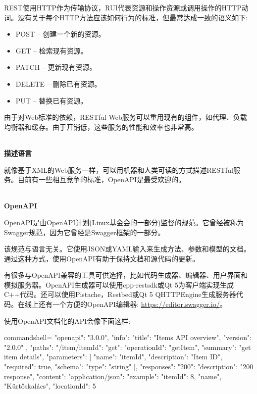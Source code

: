 REST使用HTTP作为传输协议，RUI代表资源和操作资源或调用操作的HTTP动词。没有关于每个HTTP方法应该如何行为的标准，但最常达成一致的语义如下:

\begin{itemize}
\item 
POST – 创建一个新的资源。

\item 
GET – 检索现有资源。

\item 
PATCH – 更新现有资源。

\item 
DELETE – 删除已有资源。

\item 
PUT – 替换已有资源。
\end{itemize}

由于对Web标准的依赖，RESTful Web服务可以重用现有的组件，如代理、负载均衡器和缓存。由于开销低，这些服务的性能和效率也非常高。

\hspace*{\fill} \\ %
\noindent
\textbf{描述语言}

就像基于XML的Web服务一样，可以用机器和人类可读的方式描述RESTful服务。目前有一些相互竞争的标准，OpenAPI是最受欢迎的。

\hspace*{\fill} \\ %
\noindent
\textbf{OpenAPI}

OpenAPI是由OpenAPI计划(Linux基金会的一部分)监督的规范。它曾经被称为Swagger规范，因为它曾经是Swagger框架的一部分。

该规范与语言无关。它使用JSON或YAML输入来生成方法、参数和模型的文档。通过这种方式，使用OpenAPI有助于保持文档和源代码的更新。

有很多与OpenAPI兼容的工具可供选择，比如代码生成器、编辑器、用户界面和模拟服务器。OpenAPI生成器可以使用cpp-restsdk或Qt 5为客户端实现生成C++代码。还可以使用Pistache，Restbed或Qt 5 QHTTPEngine生成服务器代码。在线上还有一个方便的OpenAPI编辑器: \url{https://editor.swagger.io/}。

使用OpenAPI文档化的API会像下面这样:

\begin{tcblisting}{commandshell={}}
{
  "openapi": "3.0.0",
  "info": {
    "title": "Items API overview",
    "version": "2.0.0"
  },
  "paths": {
    "/item/{itemId}": {
      "get": {
        "operationId": "getItem",
        "summary": "get item details",
        "parameters": [
          "name": "itemId",
          "description": "Item ID",
          "required": true,
          "schema": {
            "type": "string"
        }
      ],
      "responses": {
        "200": {
          "description": "200 response",
            "content": {
              "application/json": {
                "example": {
                  "itemId": 8,
                  "name", "Kürtőskalács",
                  "locationId": 5
                }
              }
            }
          }
        }
      }
    }
  }
}
\end{tcblisting}

